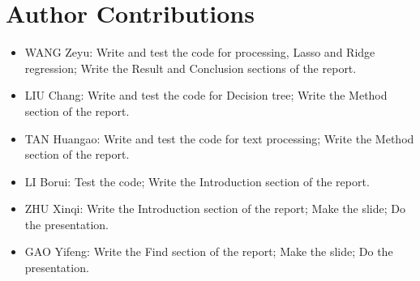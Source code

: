 \documentclass[11pt]{article}
\renewcommand\thesection{\arabic{section}}
\begin{document}

\newpage

\appendix
\renewcommand\thesection{\Alph{section}}

\section{Author Contributions}

\begin{itemize}
  \item WANG Zeyu: Write and test the code for processing, Lasso and Ridge regression; Write the Result and Conclusion sections of the report.
  \item LIU Chang: Write and test the code for Decision tree; Write the Method section of the report.
  \item TAN Huangao: Write and test the code for text processing; Write the Method section of the report.
  \item LI Borui: Test the code; Write the Introduction section of the report.
  \item ZHU Xinqi: Write the Introduction section of the report; Make the slide; Do the presentation.
  \item GAO Yifeng: Write the Find section of the report; Make the slide; Do the presentation.
\end{itemize}
\end{document}

